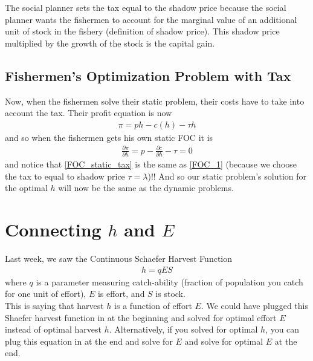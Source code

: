 \documentclass[12pt]{article}
\begin{document}
The social planner sets the tax equal to the shadow price because the social planner wants the fishermen to account for the marginal value of an additional unit of stock in the fishery (definition of shadow price). This shadow price multiplied by the growth of the stock is the capital gain. 


\subsection{Fishermen's Optimization Problem with Tax}
Now, when the fishermen solve their static problem, their costs have to take into account the tax. Their profit equation is now 
\begin{align}
    \pi = ph - c(h) - \tau h
\end{align}
and so when the fishermen gets his own static FOC it is
\begin{align}
    \frac{\partial \pi}{\partial h} = p - \frac{\partial c}{\partial h}- \tau = 0 \label{FOC_static_tax}
\end{align}
and notice that \ref{FOC_static_tax} is the same as \ref{FOC_1} (because we choose the tax to equal to shadow price $\tau = \lambda$)!! And so our static problem's solution for the optimal $h$ will now be the same as the dynamic problems. 


\section{Connecting $h$ and $E$}

Last week, we saw the Continuous Schaefer Harvest Function
\begin{align}
    h = q E S
    \label{schaefer}
\end{align}
where $q$ is a parameter measuring catch-ability (fraction of population you catch for one unit of effort), $E$ is effort, and $S$ is stock. \\

This is saying that harvest $h$ is a function of effort $E$. We could have plugged this Shaefer harvest function in at the beginning and solved for optimal effort $E$ instead of optimal harvest $h$. Alternatively, if you solved for optimal $h$, you can plug this equation in at the end and solve for $E$ and solve for optimal $E$ at the end. 
\end{document}
